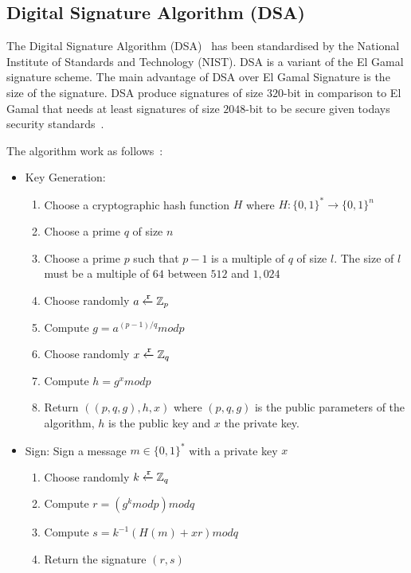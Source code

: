 \subsection{Digital Signature Algorithm (DSA)}
\label{preliminaries:sign:dsa}

The Digital Signature Algorithm (DSA)~\cite{dsa_nist} has been standardised by the National Institute of Standards and Technology (NIST). DSA is a variant of the El Gamal signature scheme. The main advantage of DSA over El Gamal Signature is the size of the signature. DSA produce signatures of size $320$-bit in comparison to El Gamal that needs at least signatures of size $2048$-bit to be secure given todays security standards~\cite{dsa}.

The algorithm work as follows~\cite{dsa}:

\begin{itemize}
  \item Key Generation:
    \begin{enumerate}
      \item Choose a cryptographic hash function $H$ where $H: \{0, 1\}^{*} \rightarrow \{0, 1\}^{n}$
      \item Choose a prime $q$ of size $n$
      \item Choose a prime $p$ such that $p - 1$ is a multiple of $q$ of size $l$. The size of $l$ must be a multiple of $64$ between $512$ and $1,024$
      \item Choose randomly $a \xleftarrow{\mathtt{r}}{\mathbb{Z}_p}$
      \item Compute $g = a^{(p - 1)/q} mod p$
      \item Choose randomly $x \xleftarrow{\mathtt{r}}{\mathbb{Z}_q}$
      \item Compute $h = g^{x} modp$
      \item Return $((p, q, g), h, x)$ where $(p, q, g)$ is the public parameters of the algorithm, $h$ is the public key and $x$ the private key.
    \end{enumerate}
  \item Sign: Sign a message $m \in \{0, 1\}^{*}$ with a private key $x$
    \begin{enumerate}
      \item Choose randomly $k \xleftarrow{\mathtt{r}}{\mathbb{Z}_q}$
      \item Compute $r = (g^{k}modp)modq$
      \item Compute $s = k^{-1}(H(m) + xr) modq$
      \item Return the signature $(r, s)$
    \end{enumerate}

\end{itemize}
